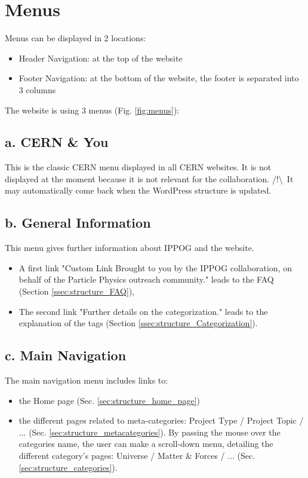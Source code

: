 \newpage
\section{Menus}\label{sec:structure_menus}

Menus can be displayed in 2 locations: 
\begin{itemize}
    \item Header Navigation: at the top of the website
    \item Footer Navigation: at the bottom of the website, the footer is separated into 3 columns
\end{itemize}

\bigskip 

The website is using 3 menus (Fig. \ref{fig:menus}): 

\subsection*{a. CERN \& You}
This is the classic CERN menu displayed in all CERN websites. It is not displayed at the moment because it is not relevant for the collaboration.
/!\textbackslash \ It may automatically come back when the WordPress structure is updated.

\subsection*{b. General Information}
This menu gives further information about IPPOG and the website. 
\begin{itemize}
    \item A first link "Custom Link Brought to you by the IPPOG collaboration, on behalf of the Particle Physics outreach community." leads to the FAQ (Section \ref{ssec:structure_FAQ}),
    \item The second link "Further details on the categorization." leads to the explanation of the tags (Section \ref{ssec:structure_Categorization}).
\end{itemize}

\subsection*{c. Main Navigation}
The main navigation menu includes links to: 
\begin{itemize}
    \item the Home page (Sec. \ref{sec:structure_home_page})
    \item the different pages related to meta-categories: Project Type / Project Topic / ... (Sec. \ref{sec:structure_metacategories}). By passing the mouse over the categories name, the user can make a scroll-down menu, detailing the different category's pages: Universe / Matter \& Forces / ... (Sec. \ref{sec:structure_categories}).
\end{itemize}

